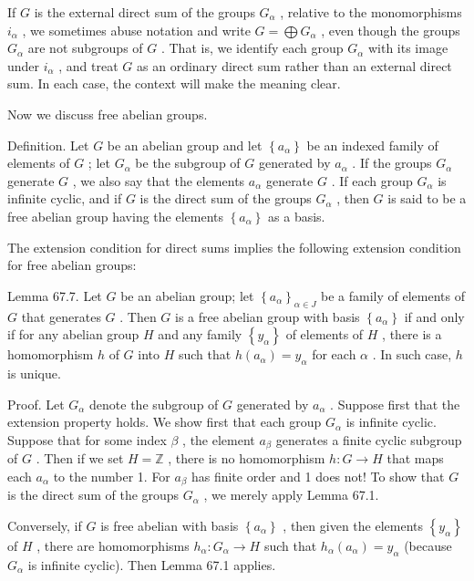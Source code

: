 If \(G\) is the external direct sum of the groups \({G}_{\alpha }\) , relative to the monomorphisms \({i}_{\alpha }\) , we sometimes abuse notation and write \(G = \bigoplus {G}_{\alpha }\) , even though the groups \({G}_{\alpha }\) are not subgroups of \(G\) . That is, we identify each group \({G}_{\alpha }\) with its image under \({i}_{\alpha }\) , and treat \(G\) as an ordinary direct sum rather than an external direct sum. In each case, the context will make the meaning clear.

Now we discuss free abelian groups.

Definition. Let \(G\) be an abelian group and let \(\left\{  {a}_{\alpha }\right\}\) be an indexed family of elements of \(G\) ; let \({G}_{\alpha }\) be the subgroup of \(G\) generated by \({a}_{\alpha }\) . If the groups \({G}_{\alpha }\) generate \(G\) , we also say that the elements \({a}_{\alpha }\) generate \(G\) . If each group \({G}_{\alpha }\) is infinite cyclic, and if \(G\) is the direct sum of the groups \({G}_{\alpha }\) , then \(G\) is said to be a free abelian group having the elements \(\left\{  {a}_{\alpha }\right\}\) as a basis.

The extension condition for direct sums implies the following extension condition for free abelian groups:

Lemma 67.7. Let \(G\) be an abelian group; let \({\left\{  {a}_{\alpha }\right\}  }_{\alpha  \in  J}\) be a family of elements of \(G\) that generates \(G\) . Then \(G\) is a free abelian group with basis \(\left\{  {a}_{\alpha }\right\}\) if and only if for any abelian group \(H\) and any family \(\left\{  {y}_{\alpha }\right\}\) of elements of \(H\) , there is a homomorphism \(h\) of \(G\) into \(H\) such that \(h\left( {a}_{\alpha }\right)  = {y}_{\alpha }\) for each \(\alpha\) . In such case, \(h\) is unique.

Proof. Let \({G}_{\alpha }\) denote the subgroup of \(G\) generated by \({a}_{\alpha }\) . Suppose first that the extension property holds. We show first that each group \({G}_{\alpha }\) is infinite cyclic. Suppose that for some index \(\beta\) , the element \({a}_{\beta }\) generates a finite cyclic subgroup of \(G\) . Then if we set \(H = \mathbb{Z}\) , there is no homomorphism \(h : G \rightarrow  H\) that maps each \({a}_{\alpha }\) to the number 1. For \({a}_{\beta }\) has finite order and 1 does not! To show that \(G\) is the direct sum of the groups \({G}_{\alpha }\) , we merely apply Lemma 67.1.

Conversely, if \(G\) is free abelian with basis \(\left\{  {a}_{\alpha }\right\}\) , then given the elements \(\left\{  {y}_{\alpha }\right\}\) of \(H\) , there are homomorphisms \({h}_{\alpha } : {G}_{\alpha } \rightarrow  H\) such that \({h}_{\alpha }\left( {a}_{\alpha }\right)  = {y}_{\alpha }\) (because \({G}_{\alpha }\) is infinite cyclic). Then Lemma 67.1 applies.

